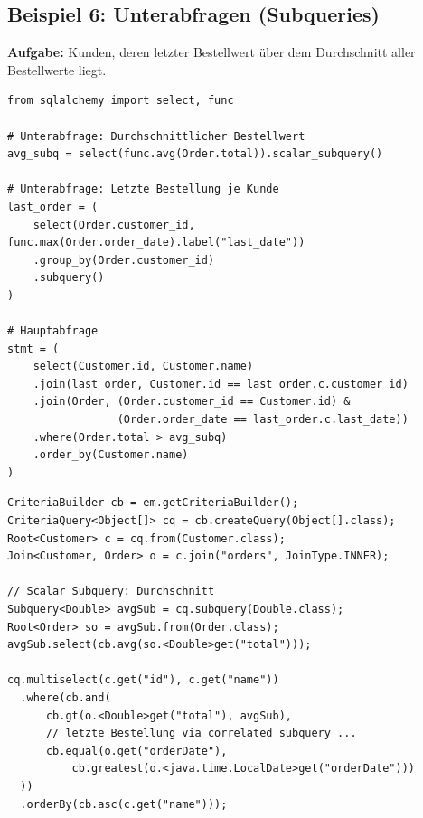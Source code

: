 \subsection{Beispiel 6: Unterabfragen (Subqueries)}
\label{subsec:bsp6}

\textbf{Aufgabe:} Kunden, deren letzter Bestellwert über dem Durchschnitt
aller Bestellwerte liegt.

\begin{lstlisting}[style=pythonstyle, caption={Beispiel 6 -- Python (Subquery)},
  label=lst:bsp6_py]
from sqlalchemy import select, func

# Unterabfrage: Durchschnittlicher Bestellwert
avg_subq = select(func.avg(Order.total)).scalar_subquery()

# Unterabfrage: Letzte Bestellung je Kunde
last_order = (
    select(Order.customer_id, func.max(Order.order_date).label("last_date"))
    .group_by(Order.customer_id)
    .subquery()
)

# Hauptabfrage
stmt = (
    select(Customer.id, Customer.name)
    .join(last_order, Customer.id == last_order.c.customer_id)
    .join(Order, (Order.customer_id == Customer.id) &
                 (Order.order_date == last_order.c.last_date))
    .where(Order.total > avg_subq)
    .order_by(Customer.name)
)
\end{lstlisting}

\begin{lstlisting}[style=javastyle, caption={Beispiel 6 -- Java (Subquery)},
  label=lst:bsp6_java]
CriteriaBuilder cb = em.getCriteriaBuilder();
CriteriaQuery<Object[]> cq = cb.createQuery(Object[].class);
Root<Customer> c = cq.from(Customer.class);
Join<Customer, Order> o = c.join("orders", JoinType.INNER);

// Scalar Subquery: Durchschnitt
Subquery<Double> avgSub = cq.subquery(Double.class);
Root<Order> so = avgSub.from(Order.class);
avgSub.select(cb.avg(so.<Double>get("total")));

cq.multiselect(c.get("id"), c.get("name"))
  .where(cb.and(
      cb.gt(o.<Double>get("total"), avgSub),
      // letzte Bestellung via correlated subquery ...
      cb.equal(o.get("orderDate"),
          cb.greatest(o.<java.time.LocalDate>get("orderDate")))
  ))
  .orderBy(cb.asc(c.get("name")));
\end{lstlisting}

